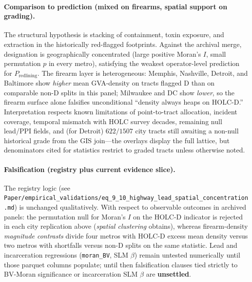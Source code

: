 \paragraph{Comparison to prediction (mixed on firearms, spatial support on grading).}
The structural hypothesis is stacking of containment, toxin exposure, and extraction in the historically red-flagged footprints. Against the archival merge, designation is geographically concentrated (large positive Moran's $I$, small permutation $p$ in every metro), satisfying the weakest operator-level prediction for $P_{\text{redlining}}$. The firearm layer is heterogeneous: Memphis, Nashville, Detroit, and Baltimore show \emph{higher} mean GVA-density on tracts flagged D than on comparable non-D splits in this panel; Milwaukee and DC show \emph{lower}, so the firearm surface alone falsifies unconditional ``density always heaps on HOLC-D.'' Interpretation respects known limitations of point-to-tract allocation, incident coverage, temporal mismatch with HOLC survey decades, remaining null lead/PPI fields, and (for Detroit) \(622{/}1507\) city tracts still awaiting a non-null historical grade from the GIS join---the overlays display the full lattice, but denominators cited for statistics restrict to graded tracts unless otherwise noted.

\paragraph{Falsification (registry plus current evidence slice).}
The registry logic (see \texttt{Paper/empirical\_validations/eq\_9\_10\_highway\_lead\_spatial\_concentration.md}) is unchanged qualitatively. With respect to observable outcomes in archived panels: the permutation null for Moran's \(I\) on the HOLC-D indicator is rejected in each city replication above (\emph{spatial clustering} obtains), whereas firearm-density \emph{magnitude contrasts} divide four metros with HOLC-D excess mean density versus two metros with shortfalls versus non-D splits on the same statistic. Lead and incarceration regressions (\texttt{moran\_BV}, SLM \(\beta\)) remain untested numerically until those parquet columns populate; until then falsification clauses tied strictly to BV-Moran significance or incarceration SLM \(\beta\) are \textbf{unsettled}.

